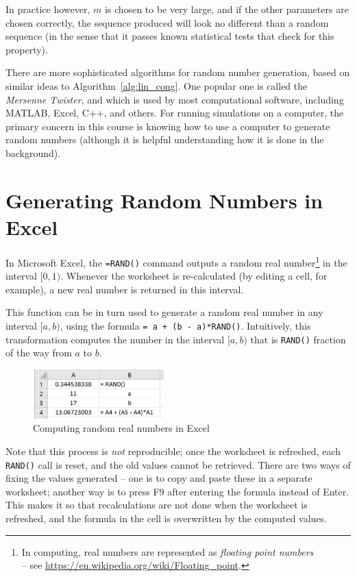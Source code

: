 In practice however, $m$ is chosen to be very large, and if the other parameters are chosen correctly, the sequence produced will look no different than a random sequence (in the sense that it passes known statistical tests that check for this property).

There are more sophisticated algorithms for random number generation, based on similar ideas to Algorithm~\ref{alg:lin_cong}. 
One popular one is called the \emph{Mersenne Twister}, and which is used by most computational software, including MATLAB, Excel, C++, and others.
For running simulations on a computer, the primary concern in this course is knowing how to use a computer to generate random numbers (although it is helpful understanding how it is done in the background).

\section{Generating Random Numbers in Excel}
In Microsoft Excel, the \texttt{=RAND()} command outputs a random real number\footnote{In computing, real numbers are represented as \emph{floating point numbers} \\ -- see \url{https://en.wikipedia.org/wiki/Floating_point}.} in the interval $[0,1)$.
Whenever the worksheet is re-calculated (by editing a cell, for example), a new real number is returned in this interval.

This function can be in turn used to generate a random real number in any interval $[a,b)$, using the formula \texttt{= a + (b - a)*RAND()}.
Intuitively, this transformation computes the number in the interval $[a,b)$ that is \texttt{RAND()} fraction of the way from $a$ to $b$.

\begin{figure}[htbp]
	\centering
	\includegraphics[width=0.45\textwidth]{fig/1_excel_rand.png}
	\caption{Computing random real numbers in Excel}
	\label{fig:excel_rand}
\end{figure}

Note that this process is \emph{not} reproducible; once the worksheet is refreshed, each \texttt{RAND()} call is reset, and the old values cannot be retrieved.
There are two ways of fixing the values generated -- one is to copy and paste these in a separate worksheet; another way is to press F9 after entering the formula instead of Enter.
This makes it so that recalculations are not done when the worksheet is refreshed, and the formula in the cell is overwritten by the computed values.


